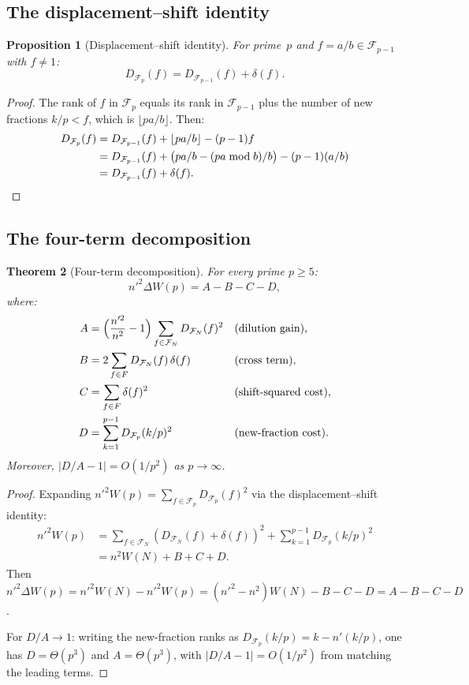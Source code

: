 \documentclass[11pt]{article}
\newtheorem{theorem}{Theorem}[section]
\newtheorem{proposition}[theorem]{Proposition}
\theoremstyle{definition}
\newcommand{\F}{\mathcal{F}}
\begin{document}
\subsection{The displacement--shift identity}

\begin{proposition}[Displacement--shift identity]\label{prop:disp-shift}
For prime~$p$ and $f = a/b \in \F_{p-1}$ with $f \ne 1$:
\[
  D_{\F_p}(f) = D_{\F_{p-1}}(f) + \delta(f).
\]
\end{proposition}

\begin{proof}
The rank of $f$ in $\F_p$ equals its rank in $\F_{p-1}$ plus the
number of new fractions $k/p < f$, which is $\lfloor pa/b \rfloor$.
Then:
\begin{align*}
  D_{\F_p}(f) &= D_{\F_{p-1}}(f) + \lfloor pa/b \rfloor - (p-1)f \\
  &= D_{\F_{p-1}}(f) + \bigl(pa/b - (pa \bmod b)/b\bigr) - (p-1)(a/b) \\
  &= D_{\F_{p-1}}(f) + \delta(f). \qedhere
\end{align*}
\end{proof}

\subsection{The four-term decomposition}

\begin{theorem}[Four-term decomposition]\label{thm:four-term}
For every prime $p \ge 5$:
\begin{equation}\label{eq:four-term}
  n'^2 \Delta W(p) = A - B - C - D,
\end{equation}
where:
\begin{align}
  A &= \Bigl(\frac{n'^2}{n^2} - 1\Bigr)
    \sum_{f \in \F_N} D_{\F_N}(f)^2
    && \text{(dilution gain),} \\
  B &= 2\sum_{f \in F} D_{\F_N}(f)\,\delta(f)
    && \text{(cross term),} \\
  C &= \sum_{f \in F} \delta(f)^2
    && \text{(shift-squared cost),} \\
  D &= \sum_{k=1}^{p-1} D_{\F_p}(k/p)^2
    && \text{(new-fraction cost).}
\end{align}
Moreover, $|D/A - 1| = O(1/p^2)$ as $p \to \infty$.
\end{theorem}

\begin{proof}
Expanding $n'^2 W(p) = \sum_{f \in \F_p} D_{\F_p}(f)^2$ via the
displacement--shift identity:
\begin{align*}
  n'^2 W(p) &= \sum_{f \in \F_N} (D_{\F_N}(f) + \delta(f))^2
    + \sum_{k=1}^{p-1} D_{\F_p}(k/p)^2 \\
  &= n^2 W(N) + B + C + D.
\end{align*}
Then $n'^2 \Delta W(p) = n'^2 W(N) - n'^2 W(p)
= (n'^2 - n^2)W(N) - B - C - D = A - B - C - D$.

For $D/A \to 1$: writing the new-fraction ranks as
$D_{\F_p}(k/p) = k - n'(k/p)$, one has $D = \Theta(p^3)$ and
$A = \Theta(p^3)$, with $|D/A - 1| = O(1/p^2)$ from matching the
leading terms.
\end{proof}
\end{document}
